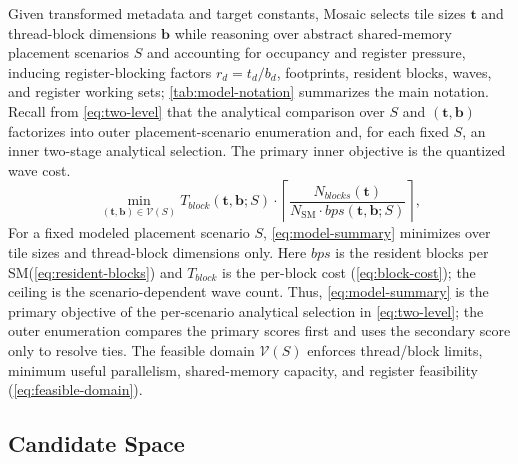 \documentclass[acmsmall,review,anonymous,screen]{acmart}
\newcommand{\name}{{Mosaic}\xspace}
\newcommand{\sm}{SM\xspace}
\newcommand{\tile}{t}
\newcommand{\tvec}{\mathbf{t}}
\newcommand{\rblk}{r}
\newcommand{\Nsm}{N_{\mathrm{SM}}}
\begin{document}
Given transformed metadata and target constants, \name selects tile sizes \(\tvec\) and thread-block dimensions \(\mathbf{b}\) while reasoning over abstract shared-memory placement scenarios \(S\) and accounting for occupancy and register pressure, inducing register-blocking factors \(\rblk_d=\tile_d/b_d\), footprints, resident blocks, waves, and register working sets; \autoref{tab:model-notation} summarizes the main notation. Recall from \autoref{eq:two-level} that the analytical comparison over \(S\) and \((\tvec,\mathbf{b})\) factorizes into outer placement-scenario enumeration and, for each fixed \(S\), an inner two-stage analytical selection. The primary inner objective is the quantized wave cost.
\begin{equation}
\min_{(\tvec,\mathbf{b})\in\mathcal{V}(S)}
T_{\mathit{block}}(\tvec,\mathbf{b};S)
\cdot
\left\lceil
\dfrac{N_{\mathit{blocks}}(\tvec)}
      {\Nsm \cdot bps(\tvec,\mathbf{b};S)}
\right\rceil,
\label{eq:model-summary}
\end{equation}
For a fixed modeled placement scenario \(S\), \autoref{eq:model-summary} minimizes over tile sizes and thread-block dimensions only. Here \(bps\) is the resident blocks per \sm (\autoref{eq:resident-blocks}) and \(T_{\mathit{block}}\) is the per-block cost (\autoref{eq:block-cost}); the ceiling is the scenario-dependent wave count. Thus, \autoref{eq:model-summary} is the primary objective of the per-scenario analytical selection in \autoref{eq:two-level}; the outer enumeration compares the primary scores first and uses the secondary score only to resolve ties. The feasible domain \(\mathcal{V}(S)\) enforces thread/block limits, minimum useful parallelism, shared-memory capacity, and register feasibility (\autoref{eq:feasible-domain}).

\subsection{Candidate Space}
\label{sec:abstraction}
\label{sec:placement}
\end{document}
